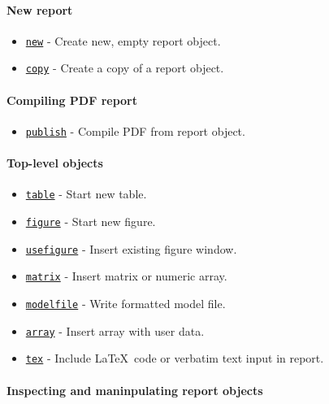 

	\paragraph{New report}
 
 \begin{itemize}
 \item
   \href{report/new}{\texttt{new}} - Create new, empty report object.
 \item
   \href{report/copy}{\texttt{copy}} - Create a copy of a report object.
 \end{itemize}
 
 \paragraph{Compiling PDF report}
 
 \begin{itemize}
 \item
   \href{report/publish}{\texttt{publish}} - Compile PDF from report
   object.
 \end{itemize}
 
 \paragraph{Top-level objects}
 
 \begin{itemize}
 \item
   \href{report/table}{\texttt{table}} - Start new table.
 \item
   \href{report/figure}{\texttt{figure}} - Start new figure.
 \item
   \href{report/userfigure}{\texttt{usefigure}} - Insert existing figure
   window.
 \item
   \href{report/matrix}{\texttt{matrix}} - Insert matrix or numeric
   array.
 \item
   \href{report/modelfile}{\texttt{modelfile}} - Write formatted model
   file.
 \item
   \href{report/array}{\texttt{array}} - Insert array with user data.
 \item
   \href{report/tex}{\texttt{tex}} - Include \LaTeX~code or verbatim text
   input in report.
 \end{itemize}
 
 \paragraph{Inspecting and maninpulating report objects}
 
